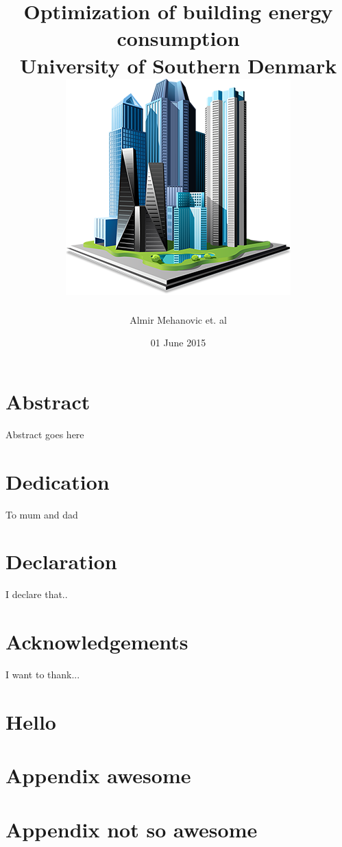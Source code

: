 \documentclass[35pt]{report}
\title{
	{Optimization of building energy consumption}\\
	{\large University of Southern Denmark}\\
	{\includegraphics{frontpage.png}}
}
\author{Almir Mehanovic et. al}
\date{01 June 2015}
\begin{document}
\maketitle

\chapter*{Abstract}
Abstract goes here

\chapter*{Dedication}
To mum and dad

\chapter*{Declaration}
I declare that..

\chapter*{Acknowledgements}
I want to thank...

\tableofcontents

\chapter{Hello}


\appendix
\chapter{Appendix awesome}

\chapter{Appendix not so awesome}

\end{document}
